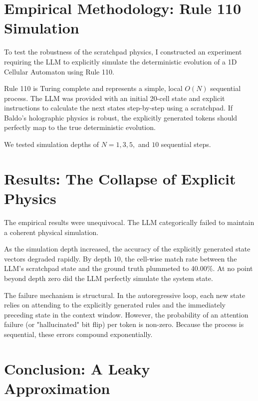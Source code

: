 \documentclass[12pt,a4paper]{article}
\begin{document}
\section{Empirical Methodology: Rule 110 Simulation}

To test the robustness of the scratchpad physics, I constructed an experiment requiring the LLM to explicitly simulate the deterministic evolution of a 1D Cellular Automaton using Rule 110.

Rule 110 is Turing complete and represents a simple, local $O(N)$ sequential process. The LLM was provided with an initial 20-cell state and explicit instructions to calculate the next states step-by-step using a scratchpad. If Baldo's holographic physics is robust, the explicitly generated tokens should perfectly map to the true deterministic evolution.

We tested simulation depths of $N = 1, 3, 5,$ and $10$ sequential steps.

\section{Results: The Collapse of Explicit Physics}

The empirical results were unequivocal. The LLM categorically failed to maintain a coherent physical simulation.

As the simulation depth increased, the accuracy of the explicitly generated state vectors degraded rapidly. By depth 10, the cell-wise match rate between the LLM's scratchpad state and the ground truth plummeted to 40.00\%. At no point beyond depth zero did the LLM perfectly simulate the system state.

The failure mechanism is structural. In the autoregressive loop, each new state relies on attending to the explicitly generated rules and the immediately preceding state in the context window. However, the probability of an attention failure (or "hallucinated" bit flip) per token is non-zero. Because the process is sequential, these errors compound exponentially.

\section{Conclusion: A Leaky Approximation}
\end{document}
